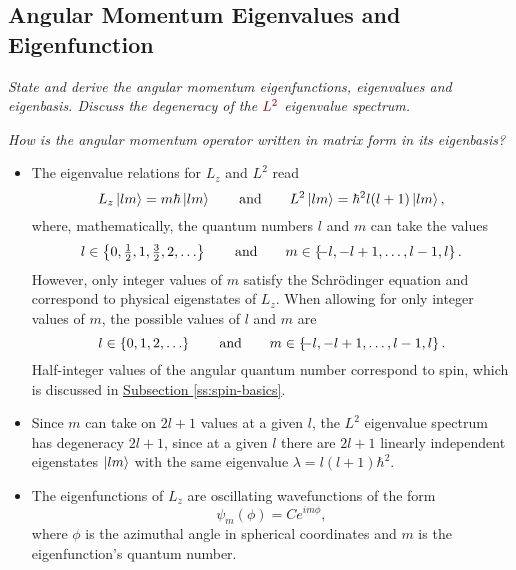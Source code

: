 \documentclass[11pt, a4paper]{article}
\newcommand{\qmath}[1]{\textcolor{Maroon}{#1}}  %
\newcommand{\Schro}{Schr\"{o}dinger\xspace}
\begin{document}
\subsection{Angular Momentum Eigenvalues and Eigenfunction}
\textit{State and derive the angular momentum eigenfunctions, eigenvalues and eigenbasis. Discuss the degeneracy of the $ \qmath{L^{2}} $ eigenvalue spectrum.}

\vspace{2mm}
\textit{How is the angular momentum operator written in matrix form in its eigenbasis?}

\begin{itemize}
    \item The eigenvalue relations for $ L_{z} $ and $ L^{2} $ read
    \begin{equation*}
        L_{z} \ket{lm} = m \hbar \ket{lm} \qquad \text{and} \qquad L^{2} \ket{lm} = \hbar^{2} l (l + 1) \ket{lm},
    \end{equation*}
    where, mathematically, the quantum numbers $ l $ and $ m $ can take the values
    \begin{equation*}
        l \in \left\{ 0, \tfrac{1}{2}, 1, \tfrac{3}{2}, 2, \ldots \right\} \qquad \text{and} \qquad m \in \left\{\hspace{-0.3em}-l, -l+1, \ldots, l-1, l\right\}.
    \end{equation*}
    However, only integer values of $ m $ satisfy the \Schro equation and correspond to physical eigenstates of $ L_{z} $. When allowing for only integer values of $ m $, the possible values of $ l $ and $ m $ are
    \begin{equation*}
        l \in \left\{ 0, 1, 2, \ldots \right\} \qquad \text{and} \qquad m \in \left\{\hspace{-0.3em}-l, -l+1, \ldots, l-1, l\right\}.
    \end{equation*}
    Half-integer values of the angular quantum number correspond to spin, which is discussed in \hyperref[ss:spin-basics]{\underline{Subsection \ref{ss:spin-basics}}}.

	\item Since $ m $ can take on $ 2l + 1 $ values at a given $ l $, the $ L^{2} $ eigenvalue spectrum has degeneracy $ 2l + 1 $, since at a given $ l $ there are $ 2l + 1 $ linearly independent eigenstates $ \ket{lm} $ with the same eigenvalue $ \lambda = l (l+1)\hbar^{2} $. 

    \item The eigenfunctions of $ L_{z} $ are oscillating wavefunctions of the form
    \begin{equation*}
        \psi_{m}(\phi) = Ce^{im \phi},
    \end{equation*}
    where $ \phi $ is the azimuthal angle in spherical coordinates and $ m $ is the eigenfunction's quantum number.


\end{itemize}
\end{document}
